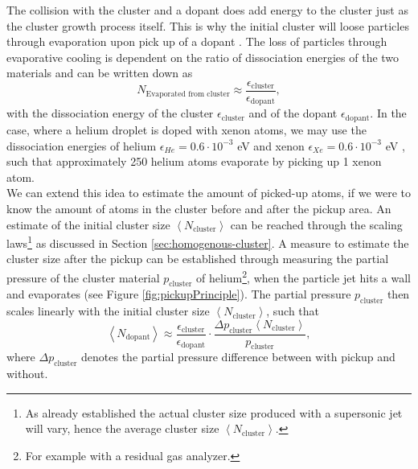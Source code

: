 The collision with the cluster and a dopant does add energy to the cluster just as the cluster growth process itself. This is why the initial cluster will loose particles through evaporation upon pick up of a dopant \citep{Gomez-2011-JCP}. The loss of particles through evaporative cooling is dependent on the ratio of dissociation energies of the two materials and can be written down as
\begin{equation}
N_{\text{Evaporated from cluster}} \approx \frac{\epsilon_{\text{cluster}}}{\epsilon_{\text{dopant}}},
\label{eq:evaporated-amount}
\end{equation}
with the dissociation energy of the cluster $\epsilon_{\text{cluster}}$ and of the dopant $\epsilon_{\text{dopant}}$. In the case, where a helium droplet is doped with xenon atoms, we may use the dissociation energies of helium $\epsilon_{He}=0.6\cdot 10^{-3}$ eV and xenon $\epsilon_{Xe}=0.6\cdot 10^{-3}$ eV \citep{Gomez-2011-JCP,Gomez-2014-Science}, such that approximately 250 helium atoms evaporate by picking up 1 xenon atom.\\
We can extend this idea to estimate the amount of picked-up atoms, if we were to know the amount of atoms in the cluster before and after the pickup area. An estimate of the initial cluster size $\left\langle N_{\text{cluster}}\right\rangle$ can be reached through the scaling laws\footnote{As already established the actual cluster size produced with a supersonic jet will vary, hence the average cluster size $\left\langle N_{\text{cluster}}\right\rangle$.} as discussed in Section \ref{sec:homogenous-cluster}. A measure to estimate the cluster size after the pickup can be established through measuring the partial pressure of the cluster material $p_{\text{cluster}}$ of helium\footnote{For example with a residual gas analyzer.}, when the particle jet hits a wall and evaporates (see Figure \ref{fig:pickupPrinciple}). The partial pressure $p_{\text{cluster}}$ then scales linearly with the initial cluster size $\left\langle N_{\text{cluster}}\right\rangle$, such that
\begin{equation}
\left\langle N_{\text{dopant}}\right\rangle \approx \frac{\epsilon_{\text{cluster}}}{\epsilon_{\text{dopant}}} \cdot \frac{\Delta p_{\text{cluster}} \left\langle N_{\text{cluster}}\right\rangle}{p_{\text{cluster}}},
\label{eq:average-dopant}
\end{equation}
where $\Delta p_{\text{cluster}}$ denotes the partial pressure difference between with pickup and without.
%
